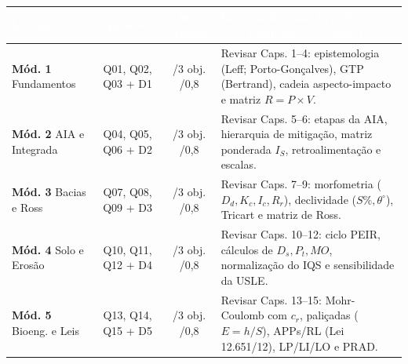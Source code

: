 \begin{center}
\renewcommand{\arraystretch}{1.28}
\small
\begin{tabularx}{\textwidth}{@{}p{2.9cm} c c >{\raggedright\arraybackslash}X@{}}
  \toprule
  \rowcolor{uefsNavy}
  \textcolor{white}{\bfseries Módulo} & \textcolor{white}{\bfseries Questões} & \textcolor{white}{\bfseries Seu Acerto} & \textcolor{white}{\bfseries Rota de Revisão Prioritária (se $< 2/3$ obj. ou $< 0,5$ diss.)} \\
  \midrule
  \textbf{Mód. 1} \newline Fundamentos & Q01, Q02, Q03 \newline + D1 & \underline{\hspace{0.5cm}}/3 obj. \newline \underline{\hspace{0.5cm}}/0,8 & Revisar Caps. 1--4: epistemologia (Leff; Porto-Gonçalves), GTP (Bertrand), cadeia aspecto-impacto e matriz $R = P \times V$. \\
  \rowcolor{bgGray}
  \textbf{Mód. 2} \newline AIA e Integrada & Q04, Q05, Q06 \newline + D2 & \underline{\hspace{0.5cm}}/3 obj. \newline \underline{\hspace{0.5cm}}/0,8 & Revisar Caps. 5--6: etapas da AIA, hierarquia de mitigação, matriz ponderada $I_S$, retroalimentação e escalas. \\
  \textbf{Mód. 3} \newline Bacias e Ross & Q07, Q08, Q09 \newline + D3 & \underline{\hspace{0.5cm}}/3 obj. \newline \underline{\hspace{0.5cm}}/0,8 & Revisar Caps. 7--9: morfometria ($D_d, K_c, I_c, R_r$), declividade ($S\%, \theta^\circ$), Tricart e matriz de Ross. \\
  \rowcolor{bgGray}
  \textbf{Mód. 4} \newline Solo e Erosão & Q10, Q11, Q12 \newline + D4 & \underline{\hspace{0.5cm}}/3 obj. \newline \underline{\hspace{0.5cm}}/0,8 & Revisar Caps. 10--12: ciclo PEIR, cálculos de $D_s, P_t, MO$, normalização do IQS e sensibilidade da USLE. \\
  \textbf{Mód. 5} \newline Bioeng. e Leis & Q13, Q14, Q15 \newline + D5 & \underline{\hspace{0.5cm}}/3 obj. \newline \underline{\hspace{0.5cm}}/0,8 & Revisar Caps. 13--15: Mohr-Coulomb com $c_r$, paliçadas ($E = h/S$), APPs/RL (Lei 12.651/12), LP/LI/LO e PRAD. \\
  \bottomrule
\end{tabularx}
\end{center}


